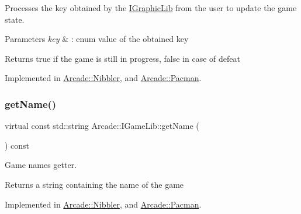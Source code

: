 Processes the key obtained by the \hyperlink{class_arcade_1_1_i_graphic_lib}{I\+Graphic\+Lib} from the user to update the game state. 


\begin{DoxyParams}{Parameters}
{\em key} & \+: enum value of the obtained key \\
\hline
\end{DoxyParams}
\begin{DoxyReturn}{Returns}
true if the game is still in progress, false in case of defeat 
\end{DoxyReturn}


Implemented in \hyperlink{class_arcade_1_1_nibbler_a979cdf9080be6cb60bf1b4e757029845}{Arcade\+::\+Nibbler}, and \hyperlink{class_arcade_1_1_pacman_ac5fa3a4d5eaa81d37e8b63451265870d}{Arcade\+::\+Pacman}.

\mbox{\label{class_arcade_1_1_i_game_lib_afd2652d62ebfda4caa5d0c05ff40ed61}} 
\subsubsection{\texorpdfstring{get\+Name()}{getName()}}
{\footnotesize\ttfamily virtual const std\+::string Arcade\+::\+I\+Game\+Lib\+::get\+Name (\begin{DoxyParamCaption}{ }\end{DoxyParamCaption}) const\hspace{0.3cm}{\ttfamily [pure virtual]}}



Game name\textquotesingle{}s getter. 

\begin{DoxyReturn}{Returns}
a string containing the name of the game 
\end{DoxyReturn}


Implemented in \hyperlink{class_arcade_1_1_nibbler_abbd3cd2246448056bc84b5b893f325d4}{Arcade\+::\+Nibbler}, and \hyperlink{class_arcade_1_1_pacman_abc48d59a534276889f45128fe877d5d9}{Arcade\+::\+Pacman}.

\mbox{\label{class_arcade_1_1_i_game_lib_a00cdcad68c670aecbcc249a2995833b6}} 
